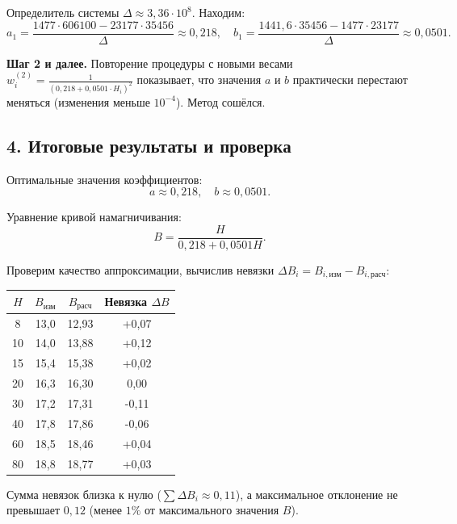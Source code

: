 \documentclass{article}
\begin{document}
Определитель системы $\Delta \approx 3{,}36 \cdot 10^8$. Находим:
\begin{equation}
a_1 = \frac{1477 \cdot 606100 - 23177 \cdot 35456}{\Delta} \approx 0{,}218, \quad
b_1 = \frac{1441{,}6 \cdot 35456 - 1477 \cdot 23177}{\Delta} \approx 0{,}0501.
\end{equation}

\textbf{Шаг 2 и далее.} 
Повторение процедуры с новыми весами $w_i^{(2)} = \frac{1}{(0{,}218 + 0{,}0501 \cdot H_i)^2}$ показывает, что значения $a$ и $b$ практически перестают меняться (изменения меньше $10^{-4}$). Метод сошёлся.

\subsection*{4. Итоговые результаты и проверка}

Оптимальные значения коэффициентов:
\begin{equation}
\boxed{a \approx 0{,}218, \quad b \approx 0{,}0501.}
\end{equation}

Уравнение кривой намагничивания:
\begin{equation}
B = \frac{H}{0{,}218 + 0{,}0501H}.
\end{equation}

Проверим качество аппроксимации, вычислив невязки $\Delta B_i = B_{i,\text{изм}} - B_{i,\text{расч}}$:

\begin{center}
\begin{tabular}{|c|c|c|c|}
\hline
$H$ & $B_{\text{изм}}$ & $B_{\text{расч}}$ & Невязка $\Delta B$ \\
\hline
8 & 13,0 & 12,93 & +0,07 \\
10 & 14,0 & 13,88 & +0,12 \\
15 & 15,4 & 15,38 & +0,02 \\
20 & 16,3 & 16,30 & 0,00 \\
30 & 17,2 & 17,31 & -0,11 \\
40 & 17,8 & 17,86 & -0,06 \\
60 & 18,5 & 18,46 & +0,04 \\
80 & 18,8 & 18,77 & +0,03 \\
\hline
\end{tabular}
\end{center}

Сумма невязок близка к нулю ($\sum \Delta B_i \approx 0{,}11$), а максимальное отклонение не превышает $0{,}12$ (менее $1\%$ от максимального значения $B$).
\end{document}
